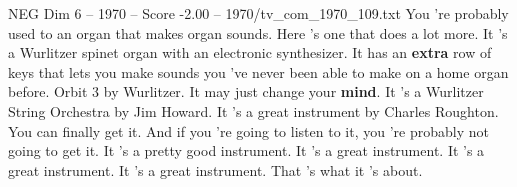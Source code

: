 \begin{textsample}{NEG Dim 6 – 1970 – Score -2.00 – 1970/tv\_com\_1970\_109.txt}  \label{ex:f6_neg_065}
You 're probably used to an organ that makes organ sounds.
Here 's one that does a lot more.
It 's a Wurlitzer spinet organ with an electronic synthesizer.
It has an \textbf{extra} row of keys that lets you make sounds you 've never been able to make on a home organ before.
Orbit 3 by Wurlitzer.
It may just change your \textbf{mind}.
It 's a Wurlitzer String Orchestra by Jim Howard.
It 's a great instrument by Charles Roughton.
You can finally get it.
And if you 're going to listen to it, you 're probably not going to get it.
It 's a pretty good instrument.
It 's a great instrument.
It 's a great instrument.
It 's a great instrument.
That 's what it 's about.

\end{textsample}
